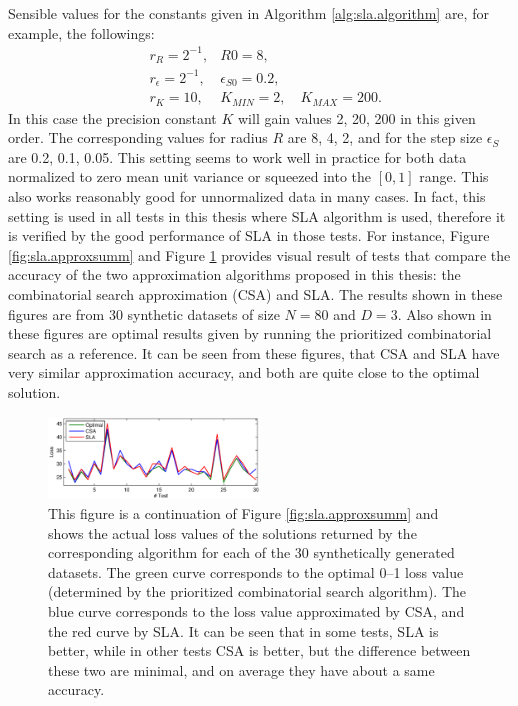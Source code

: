 Sensible values for the constants given in Algorithm
\ref{alg:sla.algorithm} are, for example, the followings:
\[ \begin{array} {lll}
& r_R = 2^{-1}, &R0 = 8, \\
& r_\epsilon = 2^{-1}, &\epsilon_{S0} = 0.2, \\
& r_K = 10, &K_{MIN} = 2, \quad K_{MAX} = 200.
\end{array} \] 
In this case the precision constant $K$ will gain values 2, 20, 200 in
this given order. The corresponding values for radius $R$ are 8, 4, 2,
and for the step size $\epsilon_S$ are 0.2, 0.1, 0.05. This setting
seems to work well in practice for both data normalized to zero mean
unit variance or squeezed into the $[0,1]$ range. This also works
reasonably good for unnormalized data in many cases. In fact, this
setting is used in all tests in this thesis where SLA algorithm is
used, therefore it is verified by the good performance of SLA in those
tests. For instance, Figure \ref{fig:sla.approxsumm} and Figure
\ref{fig:sla.approxlosses} provides visual result of tests that
compare the accuracy of the two approximation algorithms proposed in
this thesis: the combinatorial search approximation (CSA) and SLA. The
results shown in these figures are from 30 synthetic datasets of size
$N=80$ and $D=3$. Also shown in these figures are optimal results
given by running the prioritized combinatorial search as a
reference. It can be seen from these figures, that CSA and SLA have
very similar approximation accuracy, and both are quite close to the
optimal solution.



\begin{figure}[here]
\includegraphics[width=0.50\textwidth]{images/fig55_approxlosses.eps}
\caption{ This figure is a continuation of Figure
  \ref{fig:sla.approxsumm} and shows the actual loss values of the
  solutions returned by the corresponding algorithm for each of the 30
  synthetically generated datasets. The green curve corresponds to the
  optimal 0--1 loss value (determined by the prioritized combinatorial
  search algorithm). The blue curve corresponds to the loss value
  approximated by CSA, and the red curve by SLA. It can be seen that
  in some tests, SLA is better, while in other tests CSA is better,
  but the difference between these two are minimal, and on average
  they have about a same accuracy.  }
\label{fig:sla.approxlosses}
\end{figure}

